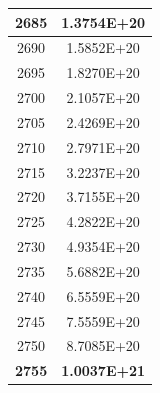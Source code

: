 \documentclass[a4paper]{article}
\begin{document}
\begin{tabular}{| c | c |}
    	2685 & 1.3754E+20 \\\hline
    	2690 & 1.5852E+20 \\\hline
    	2695 & 1.8270E+20 \\\hline
    	2700 & 2.1057E+20 \\\hline
    	2705 & 2.4269E+20 \\\hline
    	2710 & 2.7971E+20 \\\hline
    	2715 & 3.2237E+20 \\\hline
    	2720 & 3.7155E+20 \\\hline
    	2725 & 4.2822E+20 \\\hline
    	2730 & 4.9354E+20 \\\hline
    	2735 & 5.6882E+20 \\\hline
    	2740 & 6.5559E+20 \\\hline
    	2745 & 7.5559E+20 \\\hline
    	2750 & 8.7085E+20 \\\hline
    	\textbf{2755} & \textbf{1.0037E+21} \\\hline
    \end{tabular}
    \hfill
\end{document}
